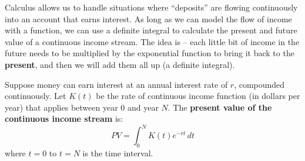 \noindent Calculus allows us to handle situations where “deposits” are flowing continuously into an account that earns interest. As long as we can model the flow of income with a function, we can use a definite integral to calculate the present and future value of a continuous income stream. The idea is – each little bit of income in the future needs to be multiplied by the exponential function to bring it back to the \textbf{present}, and then we will add them all up (a definite integral).
\begin{tcolorbox}[title = {Present Value of Income Stream}]
Suppose money can earn interest at an annual interest rate of $r$, compounded continuously. Let $K(t)$ be the rate of continuous income function (in dollars per year) that applies between year 0 and year $N$. The \textbf{present value of the continuous income stream} is:
\begin{equation}\label{eq:presentFlow}
    PV=\int_0^N K(t)e^{-rt}\,dt
\end{equation}
\noindent where $t=0$ to $t=N$ is the time interval.
\end{tcolorbox}
